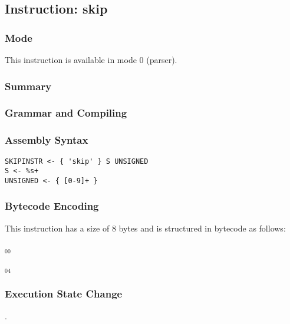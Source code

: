 \subsection{Instruction: skip}

\subsubsection{Mode}
This instruction is available in mode 0 (parser).
\subsubsection{Summary}


\subsubsection{Grammar and Compiling}


\subsubsection{Assembly Syntax}

\begin{myquote}
\begin{verbatim}
SKIPINSTR <- { 'skip' } S UNSIGNED
S <- %s+
UNSIGNED <- { [0-9]+ }
\end{verbatim}
\end{myquote}

\subsubsection{Bytecode Encoding}

This instruction has a size of 8 bytes and is structured in bytecode as follows:

$_{00}$\ 



$_{04}$\ 

\subsubsection{Execution State Change}

.


